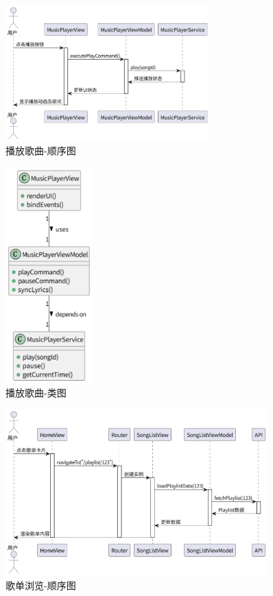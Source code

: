 \documentclass{base}
\begin{document}
\begin{figure}[H]
    \centering
    \includegraphics[width=0.7\textwidth]{images/5-1.png}
    \caption{播放歌曲-顺序图}
\end{figure}
\begin{figure}[H]
    \centering
    \includegraphics[width=0.3\textwidth]{images/5-2.png}
    \caption{播放歌曲-类图}
\end{figure}
\begin{figure}[H]
    \centering
    \includegraphics[width=0.9\textwidth]{images/5-3.png}
    \caption{歌单浏览-顺序图}
\end{figure}
\end{document}
